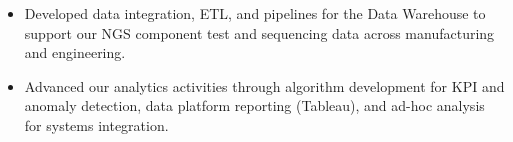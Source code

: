 \documentclass[10pt,a4paper]{altacv}
\begin{document}
\begin{itemize}
    \item   \small{Developed data integration, ETL, and pipelines for the Data Warehouse to support our NGS component test and sequencing data across manufacturing and engineering.}
    \item   \small{Advanced our analytics activities through algorithm  development for KPI and anomaly detection, data platform reporting (Tableau), and ad-hoc analysis for systems integration.}
\end{itemize}

\medskip



\end{document}
